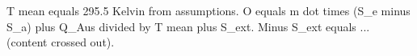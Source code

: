 T mean equals 295.5 Kelvin from assumptions.  
O equals m dot times (S_e minus S_a) plus Q_Aus divided by T mean plus S_ext.  
Minus S_ext equals ... (content crossed out).